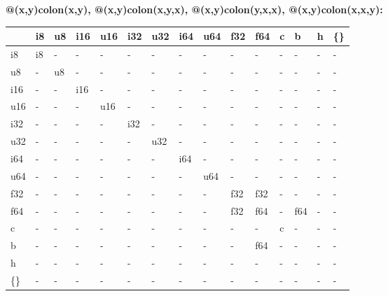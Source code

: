 \textbf{@(x,y)colon(x,y), @(x,y)colon(x,y,x), @(x,y)colon(y,x,x), @(x,y)colon(x,x,y):}
\begin{scriptsize}\begin{tt}\begin{center}\vspace{-.3cm}\begin{tabular}{|m{.65cm}||m{.65cm}|m{.65cm}|m{.65cm}|m{.65cm}|m{.65cm}|m{.65cm}|m{.65cm}|m{.65cm}|m{.65cm}|m{.65cm}|m{.65cm}|m{.65cm}|m{.65cm}|m{.65cm}|}\hline 
&i8&u8&i16&u16&i32&u32&i64&u64&f32&f64&c&b&h&\{\}\\ \hline \hline
i8&i8&-&-&-&-&-&-&-&-&-&-&-&-&-\\ \hline
u8&-&u8&-&-&-&-&-&-&-&-&-&-&-&-\\ \hline
i16&-&-&i16&-&-&-&-&-&-&-&-&-&-&-\\ \hline
u16&-&-&-&u16&-&-&-&-&-&-&-&-&-&-\\ \hline
i32&-&-&-&-&i32&-&-&-&-&-&-&-&-&-\\ \hline
u32&-&-&-&-&-&u32&-&-&-&-&-&-&-&-\\ \hline
i64&-&-&-&-&-&-&i64&-&-&-&-&-&-&-\\ \hline
u64&-&-&-&-&-&-&-&u64&-&-&-&-&-&-\\ \hline
f32&-&-&-&-&-&-&-&-&f32&f32&-&-&-&-\\ \hline
f64&-&-&-&-&-&-&-&-&f32&f64&-&f64&-&-\\ \hline
c&-&-&-&-&-&-&-&-&-&-&c&-&-&-\\ \hline
b&-&-&-&-&-&-&-&-&-&f64&-&-&-&-\\ \hline
h&-&-&-&-&-&-&-&-&-&-&-&-&-&-\\ \hline
\{\}&-&-&-&-&-&-&-&-&-&-&-&-&-&-\\ \hline
\end{tabular}\end{center}\end{tt}\end{scriptsize} 

